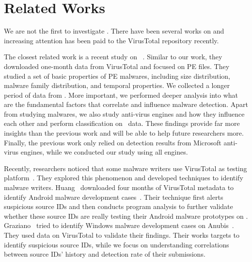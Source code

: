 \section{Related Works}
\label{sec:related}


We are not the first to investigate \vt.
There have been several works on \vt
and increasing attention has been paid to the VirusTotal repository recently.

The closest related work is a recent study on \vt{}~\cite{SongAPsys2016}. 
Similar to our work, they downloaded one-month data from VirusTotal
and focused on PE files.
They studied a set of basic properties of PE malwares,
including size distribution, malware family distribution, and temporal properties.   
We collected a longer period of data from \vt.
More important, we performed deeper analysis into what are the fundamental factors 
that correlate and influence malware detection.
Apart from studying malwares, we also study anti-virus engines and how they influence each other
and perform classification on \vt\ data.
These findings provide far more insights than the previous work and will be able to help future researchers more.
Finally, the previous work only relied on detection results from Microsoft anti-virus engines,
while we conducted our study using all engines.

Recently, researchers noticed that some malware writers use VirusTotal as testing platform~\cite{huangvt2016bigdata, neeles}.
They explored this phenomenon and developed techniques to identify malware writers. 
Huang \etal\ downloaded four months of VirusTotal metadata to identify Android malware development cases~\cite{huangvt2016bigdata}. 
Their technique first alerts suspicious source IDs 
and then conducts program analysis to further validate whether 
these source IDs are really testing their Android malware prototypes on \vt{}. 
Graziano \etal\ tried to identify Windows malware development cases on Anubis~\cite{neeles}. 
They used data on VirusTotal to validate their findings. 
Their works targets to identify suspicious source IDs, 
while we focus on understanding correlations between source IDs' history and detection rate of their submissions.



